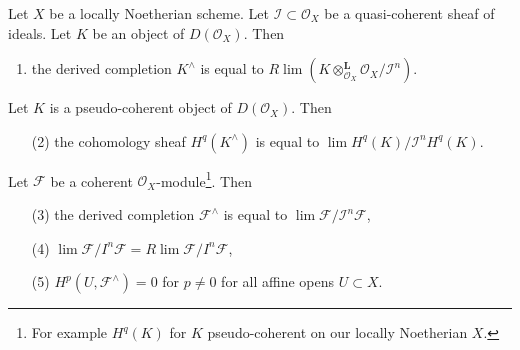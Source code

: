 \begin{lemma}
\label{lemma-derived-completion-pseudo-coherent}
Let $X$ be a locally Noetherian scheme. Let $\mathcal{I} \subset \mathcal{O}_X$
be a quasi-coherent sheaf of ideals.
Let $K$ be an object of $D(\mathcal{O}_X)$. Then
\begin{enumerate}
\item the derived completion $K^\wedge$ is equal to
$R\lim (K \otimes_{\mathcal{O}_X}^\mathbf{L} \mathcal{O}_X/\mathcal{I}^n)$.
\end{enumerate}
Let $K$ is a pseudo-coherent object of $D(\mathcal{O}_X)$. Then
\begin{enumerate}
\item[(2)] the cohomology sheaf $H^q(K^\wedge)$ is equal to
$\lim H^q(K)/\mathcal{I}^nH^q(K)$.
\end{enumerate}
Let $\mathcal{F}$ be a coherent $\mathcal{O}_X$-module\footnote{For example
$H^q(K)$ for $K$ pseudo-coherent on our locally Noetherian $X$.}. Then
\begin{enumerate}
\item[(3)] the derived completion $\mathcal{F}^\wedge$ is equal to
$\lim \mathcal{F}/\mathcal{I}^n\mathcal{F}$,
\item[(4)]
$\lim \mathcal{F}/I^n \mathcal{F} = R\lim \mathcal{F}/I^n \mathcal{F}$,
\item[(5)] $H^p(U, \mathcal{F}^\wedge) = 0$ for $p \not = 0$ for all
affine opens $U \subset X$.
\end{enumerate}
\end{lemma}

